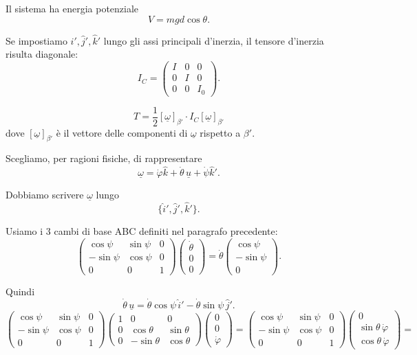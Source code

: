 Il sistema ha energia potenziale
\[
V = mgd\cos\theta.
\]

Se impostiamo \(\hat{i}',\hat{j}',\hat{k}'\) lungo gli assi principali d'inerzia, il tensore d'inerzia risulta diagonale:
\[
I_C =
\begin{pmatrix}
I & 0 & 0\\
0 & I & 0\\
0 & 0 & I_0
\end{pmatrix}.
\]

\[
T =
\frac{1}{2}
[\underline{\omega}]_{\beta'} \cdot I_C [\underline{\omega}]_{\beta'}
\]
dove \([\underline{\omega}]_{\beta'}\) è il vettore delle componenti di
\(\underline{\omega}\) rispetto a \(\beta'\).

Scegliamo, per ragioni fisiche, di rappresentare
\[
\underline{\omega}
=
\dot{\varphi}\hat{k}
+
\dot{\theta}\,\underline{u}
+
\dot{\psi}\hat{k}'.
\]

Dobbiamo scrivere \(\underline{\omega}\) lungo
\[
\{\hat{i}',\hat{j}',\hat{k}'\}.
\]

Usiamo i \(3\) cambi di base ABC definiti nel paragrafo precedente:
\[
\begin{pmatrix}
\cos\psi & \sin\psi & 0\\
-\sin\psi & \cos\psi & 0\\
0 & 0 & 1
\end{pmatrix}
\begin{pmatrix}
\dot{\theta}\\
0\\
0
\end{pmatrix}
=
\dot{\theta}
\begin{pmatrix}
\cos\psi\\
-\sin\psi\\
0
\end{pmatrix}.
\]

Quindi
\[
\dot{\theta}\,\underline{u}
=
\dot{\theta}\cos\psi\,\hat{i}'
-
\dot{\theta}\sin\psi\,\hat{j}'.
\]
\[
\begin{pmatrix}
\cos\psi & \sin\psi & 0\\
-\sin\psi & \cos\psi & 0\\
0 & 0 & 1
\end{pmatrix}
\begin{pmatrix}
1 & 0 & 0\\
0 & \cos\theta & \sin\theta\\
0 & -\sin\theta & \cos\theta
\end{pmatrix}
\begin{pmatrix}
0\\
0\\
\dot{\varphi}
\end{pmatrix}
=
\begin{pmatrix}
\cos\psi & \sin\psi & 0\\
-\sin\psi & \cos\psi & 0\\
0 & 0 & 1
\end{pmatrix}
\begin{pmatrix}
0\\
\sin\theta\,\dot{\varphi}\\
\cos\theta\,\dot{\varphi}
\end{pmatrix}
=
\]

